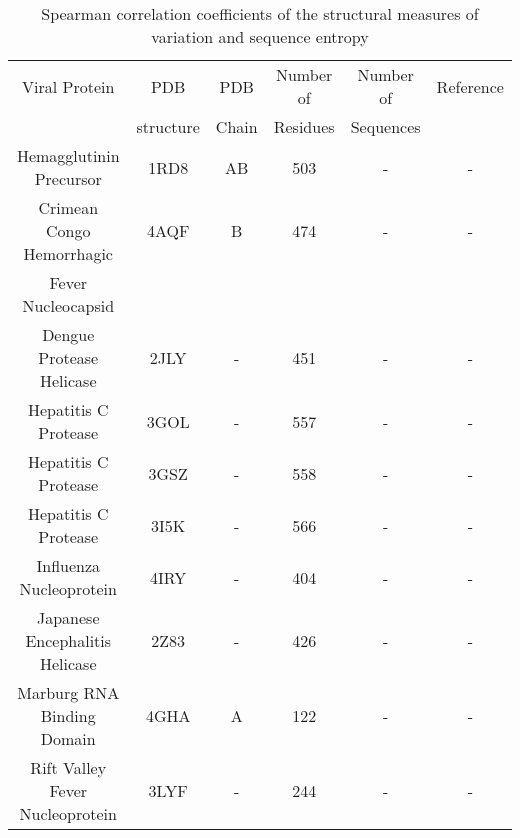 \begin{table}[htbp]
	\begin{center}
		\caption{Spearman correlation coefficients of the structural measures of variation and sequence entropy \label{tab:MDER}}
		\begin{tabular}{c c c c c c}
			\hline
			\hline
			Viral Protein & PDB & PDB & Number of & Number of & Reference \\
			 & structure & Chain & Residues & Sequences & \\
			\hline
			Hemagglutinin Precursor & 1RD8 & AB & 503 & - & - \\
			Crimean Congo Hemorrhagic & 4AQF & B & 474 & - &  - \\
			Fever Nucleocapsid & & & & & \\
			Dengue Protease Helicase & 2JLY & - & 451 & - &  - \\
			Hepatitis C Protease & 3GOL & - & 557 & - &  - \\
			Hepatitis C Protease & 3GSZ & - & 558 & - &  - \\
			Hepatitis C Protease & 3I5K & - & 566 & - &  - \\
			Influenza Nucleoprotein & 4IRY & - & 404 & - &  - \\
			Japanese Encephalitis Helicase & 2Z83 & - & 426 & - &  - \\
			Marburg RNA Binding Domain & 4GHA & A & 122 & - & - \\
			Rift Valley Fever Nucleoprotein & 3LYF & - & 244 & - & - \\
			\hline
			\hline
		\end{tabular}
	\end{center}
\end{table}
